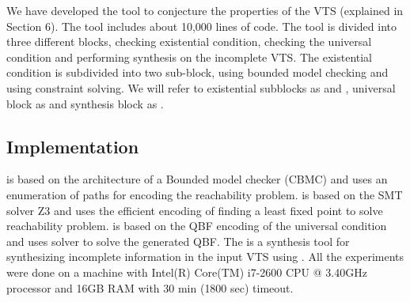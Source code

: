 %

%
We have developed the {\vtstool} tool to conjecture the properties of the VTS (explained in Section 6). 
%
%
The {\vtstool} tool includes about 10,000 lines of code.
%
The tool is divided into three different blocks,
%
checking existential condition, checking the universal condition and performing synthesis on the incomplete VTS. 
%
The existential condition is subdivided into two sub-block, using bounded model checking and using constraint solving. 
%
We will refer to existential subblocks as {\sattool} and {\smttool}, universal block as {\qbftool} and synthesis block as {\ourtool}.
%


\subsection{Implementation}
{\sattool} is based on the architecture of a Bounded model checker (CBMC) and uses an enumeration of paths for encoding the reachability problem.
%
{\smttool} is based on the SMT solver Z3 and uses the efficient encoding of finding a least fixed point to solve reachability problem. 
%
{\qbftool} is based on the QBF encoding of the universal condition and uses {\depqbf} solver to solve the generated QBF. 
%
The {\ourtool} is a synthesis tool for synthesizing incomplete information in the input VTS using {\qbftool}.
%
All the experiments were done on a machine with  Intel(R) Core(TM) i7-2600 CPU @ 3.40GHz processor and 16GB RAM with 30 min (1800 sec) timeout.

%

%


